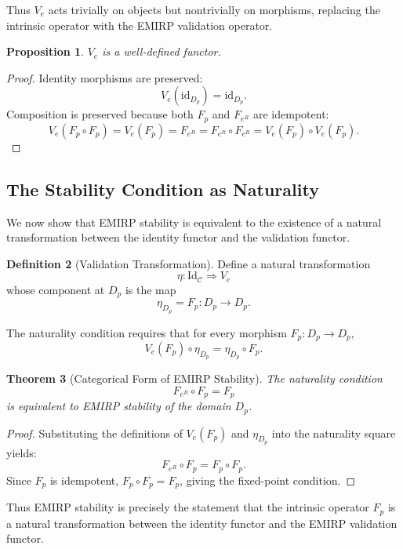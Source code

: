 \documentclass[11pt]{article}
\theoremstyle{definition}
\newtheorem{definition}{Definition}[section]
\theoremstyle{plain}
\newtheorem{theorem}[definition]{Theorem}
\newtheorem{proposition}[definition]{Proposition}
\theoremstyle{remark}
\begin{document}
Thus $V_e$ acts trivially on objects but nontrivially on morphisms,
replacing the intrinsic operator with the EMIRP validation operator.

\begin{proposition}
$V_e$ is a well-defined functor.
\end{proposition}

\begin{proof}
Identity morphisms are preserved:
\[
V_e(\mathrm{id}_{D_p}) = \mathrm{id}_{D_p}.
\]
Composition is preserved because both $F_p$ and $F_{e^R}$ are idempotent:
\[
V_e(F_p \circ F_p) = V_e(F_p) = F_{e^R}
= F_{e^R} \circ F_{e^R}
= V_e(F_p) \circ V_e(F_p).
\]
\end{proof}

\subsection{The Stability Condition as Naturality}

We now show that EMIRP stability is equivalent to the existence of a
natural transformation between the identity functor and the validation
functor.

\begin{definition}[Validation Transformation]
Define a natural transformation
\[
\eta : \mathrm{Id}_{\mathcal{C}} \Rightarrow V_e
\]
whose component at $D_p$ is the map
\[
\eta_{D_p} = F_p : D_p \to D_p.
\]
\end{definition}

The naturality condition requires that for every morphism
$F_p : D_p \to D_p$,
\[
V_e(F_p) \circ \eta_{D_p}
= \eta_{D_p} \circ F_p.
\]

\begin{theorem}[Categorical Form of EMIRP Stability]
The naturality condition
\[
F_{e^R} \circ F_p = F_p
\]
is equivalent to EMIRP stability of the domain $D_p$.
\end{theorem}

\begin{proof}
Substituting the definitions of $V_e(F_p)$ and $\eta_{D_p}$ into the
naturality square yields:
\[
F_{e^R} \circ F_p = F_p \circ F_p.
\]
Since $F_p$ is idempotent, $F_p \circ F_p = F_p$, giving the fixed-point
condition.
\end{proof}

Thus EMIRP stability is precisely the statement that the intrinsic
operator $F_p$ is a natural transformation between the identity functor
and the EMIRP validation functor.
\end{document}
